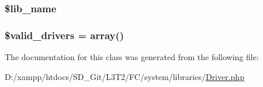 \subsubsection[{\$lib\+\_\+name}]{\setlength{\rightskip}{0pt plus 5cm}\$lib\+\_\+name\hspace{0.3cm}{\ttfamily [protected]}}\label{class_c_i___driver___library_ab820c27413d5904686c58f6b2941b603}
\hypertarget{class_c_i___driver___library_a32d963b3d49fd67f188c1a74d38be6df}{}
\subsubsection[{\$valid\+\_\+drivers}]{\setlength{\rightskip}{0pt plus 5cm}\$valid\+\_\+drivers = array()\hspace{0.3cm}{\ttfamily [protected]}}\label{class_c_i___driver___library_a32d963b3d49fd67f188c1a74d38be6df}


The documentation for this class was generated from the following file\+:\begin{DoxyCompactItemize}
\item 
D\+:/xampp/htdocs/\+S\+D\+\_\+\+Git/\+L3\+T2/\+F\+C/system/libraries/\hyperlink{system_2libraries_2_driver_8php}{Driver.\+php}\end{DoxyCompactItemize}
